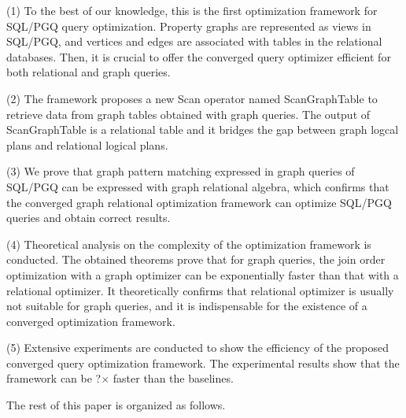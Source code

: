 (1) To the best of our knowledge, this is the first optimization framework for SQL/PGQ query optimization.
Property graphs are represented as views in SQL/PGQ, and vertices and edges are associated with tables in the relational databases.
Then, it is crucial to offer the converged query optimizer efficient for both relational and graph queries.

(2) The framework proposes a new Scan operator named ScanGraphTable to retrieve data from graph tables obtained with graph queries.
The output of ScanGraphTable is a relational table and it bridges the gap between graph logcal plans and relational logical plans.

(3) We prove that graph pattern matching expressed in graph queries of SQL/PGQ can be expressed with graph relational algebra, which confirms that the converged graph relational optimization framework can optimize SQL/PGQ queries and obtain correct results.



(4) Theoretical analysis on the complexity of the optimization framework is conducted.
The obtained theorems prove that for graph queries, the join order optimization with a graph optimizer can be exponentially faster than that with a relational optimizer. 
It theoretically confirms that relational optimizer is usually not suitable for graph queries, and it is indispensable for the existence of a converged optimization framework.

(5) Extensive experiments are conducted to show the efficiency of the proposed converged query optimization framework.
The experimental results show that the framework can be ?$\times$ faster than the baselines.

The rest of this paper is organized as follows.


